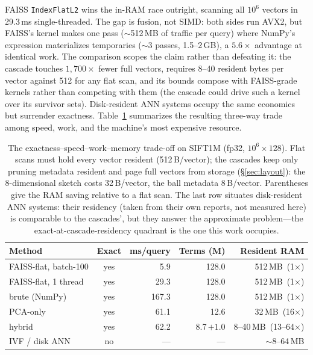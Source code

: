 \documentclass[sigconf,nonacm]{acmart}
\begin{document}
FAISS \texttt{IndexFlatL2} wins the in-RAM race outright, scanning all
$10^6$ vectors in 29.3\,ms single-threaded. The gap is fusion, not SIMD:
both sides run AVX2, but FAISS's kernel makes one pass ($\sim$512\,MB of
traffic per query) where NumPy's expression materializes temporaries
($\sim$3 passes, 1.5--2\,GB), a $5.6\times$ advantage at identical work. The
comparison scopes the claim rather than defeating it: the cascade touches
$1{,}700\times$ fewer full vectors, requires 8--40 resident bytes per vector
against 512 for any flat scan, and its bounds compose with FAISS-grade
kernels rather than competing with them (the cascade could drive such a
kernel over its survivor sets). Disk-resident ANN systems occupy the same
economics but surrender exactness. Table~\ref{tab:resources} summarizes the
resulting three-way trade among speed, work, and the machine's most
expensive resource.

\begin{table}[t]
\caption{The exactness--speed--work--memory trade-off on SIFT1M (fp32,
$10^6 \times 128$). Flat scans must hold every vector resident
(512\,B/vector); the cascades keep only pruning metadata resident and page
full vectors from storage (\S\ref{sec:layout}): the 8-dimensional sketch
costs 32\,B/vector, the ball metadata 8\,B/vector. Parentheses give the
RAM saving relative to a flat scan. The last row situates disk-resident
ANN systems: their residency (taken from their own reports, not measured
here) is comparable to the cascades', but they answer the approximate
problem---the exact-at-cascade-residency quadrant is the one this work
occupies.}
\label{tab:resources}
\small
\begin{tabular}{@{}lcrrr@{}}
\toprule
Method & Exact & ms/query & Terms (M) & Resident RAM \\
\midrule
FAISS-flat, batch-100 & yes & 5.9 & 128.0 & 512\,MB \,(1$\times$) \\
FAISS-flat, 1 thread & yes & 29.3 & 128.0 & 512\,MB \,(1$\times$) \\
brute (NumPy) & yes & 167.3 & 128.0 & 512\,MB \,(1$\times$) \\
PCA-only~\cite{paper1} & yes & 61.1 & 12.6 & 32\,MB \,(16$\times$) \\
hybrid & yes & 62.2 & 8.7\,{\small$+1.0$} & 8--40\,MB \,(13--64$\times$) \\
\midrule
IVF / disk ANN~\cite{faiss,diskann,spann} & no & --- & --- & $\sim$8--64\,MB \\
\bottomrule
\end{tabular}
\end{table}
\end{document}
